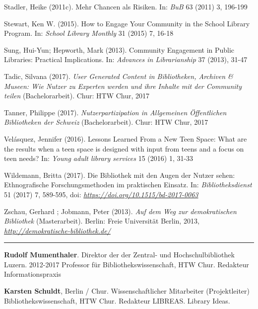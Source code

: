 \documentclass[a4paper,
fontsize=11pt,
oneside,
numbers=noperiodatend,
parskip=half-,
bibliography=totoc,
final
]{scrartcl}
\begin{document}
Stadler, Heike (2011c). Mehr Chancen als Risiken. In: \emph{BuB} 63
(2011) 3, 196-199

Stewart, Ken W. (2015). How to Engage Your Community in the School
Library Program. In: \emph{School Library Monthly} 31 (2015) 7, 16-18

Sung, Hui-Yun; Hepworth, Mark (2013). Community Engagement in Public
Libraries: Practical Implications. In: \emph{Advances in Librarianship}
37 (2013), 31-47

Tadic, Silvana (2017). \emph{User Generated Content in Bibliotheken,
Archiven \& Museen: Wie Nutzer zu Experten werden und ihre Inhalte mit
der Community teilen} (Bachelorarbeit). Chur: HTW Chur, 2017

Tanner, Philippe (2017). \emph{Nutzerpartizipation in Allgemeinen
Öffentlichen Bibliotheken der Schweiz} (Bachelorarbeit). Chur: HTW Chur,
2017

Velásquez, Jennifer (2016). Lessons Learned From a New Teen Space: What
are the results when a teen space is designed with input from teens and
a focus on teen needs? In: \emph{Young adult library services} 15 (2016)
1, 31-33

Wildemann, Britta (2017). Die Bibliothek mit den Augen der Nutzer sehen:
Ethnografische Forschungsmethoden im praktischen Einsatz. In:
\emph{Bibliotheksdienst} 51 (2017) 7, 589-595, doi:
\href{https://doi.org/10.1515/bd-2017-0063}{\emph{https://doi.org/10.1515/bd-2017-0063}}

Zschau, Gerhard ; Jobmann, Peter (2013). \emph{Auf dem Weg zur
demokratischen Bibliothek} (Masterarbeit). Berlin: Freie Universität
Berlin, 2013,
\href{http://demokratische-bibliothek.de/}{\emph{http://demokratische-bibliothek.de/}}

\begin{center}\rule{0.5\linewidth}{\linethickness}\end{center}

\textbf{Rudolf Mumenthaler}. Direktor der der Zentral- und
Hochschulbibliothek Luzern. 2012-2017 Professor für
Bibliothekswissenschaft, HTW Chur. Redakteur Informationspraxis

\textbf{Karsten Schuldt}, Berlin / Chur. Wissenschaftlicher Mitarbeiter
(Projektleiter) Bibliothekswissenschaft, HTW Chur. Redakteur LIBREAS.
Library Ideas.
\end{document}

